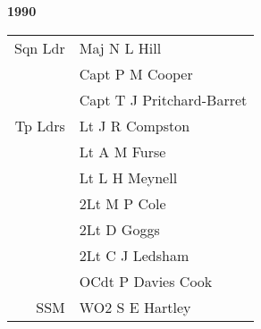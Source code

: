 \begin{center}
  \Huge
  \textbf{1990}
\end{center}

\begin{center}
  \small
  \begin{tabular}{rl}
    Sqn Ldr & Maj N L Hill \\
      & Capt P M Cooper \\
      & Capt T J Pritchard-Barret \\
    Tp Ldrs & Lt J R Compston \\
    & Lt A M Furse \\
    & Lt L H Meynell \\
    & 2Lt M P Cole \\
    & 2Lt D Goggs \\
    & 2Lt C J Ledsham \\
    & OCdt P Davies Cook \\
    SSM & WO2 S E Hartley \\
  \end{tabular}
\end{center}

